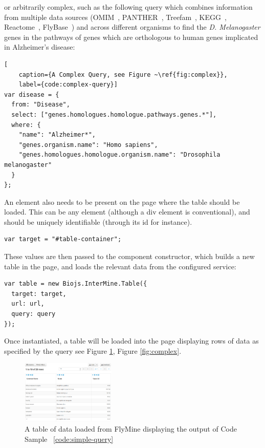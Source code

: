 \documentclass[10pt,a4paper,twocolumn]{article}
\begin{document}
or arbitrarily complex, such as the following query which combines information
from multiple data sources (OMIM~\cite{omim}, PANTHER~\cite{panther},
Treefam~\cite{treefam}, KEGG~\cite{kegg}, Reactome~\cite{reactome},
FlyBase~\cite{flybase}) and across different organisms to find the \textit{D.
Melanogaster}  genes in the pathways of genes which are orthologous to human
genes implicated in Alzheimer's disease:

\begin{lstlisting}[
    caption={A Complex Query, see Figure ~\ref{fig:complex}},
    label={code:complex-query}]
var disease = {
  from: "Disease",
  select: ["genes.homologues.homologue.pathways.genes.*"],
  where: {
    "name": "Alzheimer*",
    "genes.organism.name": "Homo sapiens",
    "genes.homologues.homologue.organism.name": "Drosophila melanogaster"
  }
};
\end{lstlisting}

An element also needs to be present on the page where the table should be
loaded. This can be any element (although a div element is 
conventional), and should be uniquely identifiable (through its id for instance).

\begin{lstlisting}[caption={Defining the Target Element}, label={code:target-el}]
var target = "#table-container";
\end{lstlisting}

These values are then passed to the component constructor, which builds
a new table in the page, and loads the relevant data from the configured service:

\begin{lstlisting}[caption={Instantiation}, label={code:instantiation}]
var table = new Biojs.InterMine.Table({
  target: target,
  url: url,
  query: query
});
\end{lstlisting}

Once instantiated, a table will be loaded into the page displaying rows of data
as specified by the query see Figure \ref{fig:1}, Figure \ref{fig:complex}.

\begin{figure}
\centering
\includegraphics[width=0.4\textwidth]{imtable.png}
\caption{
    \label{fig:1}
    A table of data loaded from FlyMine displaying the output
   of Code Sample ~\ref{code:simple-query}
}
\end{figure}
\end{document}
